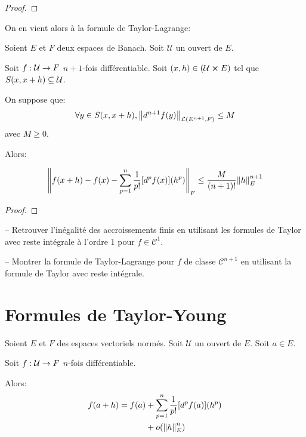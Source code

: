 \ifdefined\outputproof
\begin{proof}

\end{proof}
\fi

On en vient alors à la formule de Taylor-Lagrange:

\begin{theorem} 
	\label{theorem:taylor_lagrange_formula}
	Soient $E$ et $F$ deux espaces de Banach. Soit $\mathcal{U}$ un ouvert de
	$E$.

	Soit $f : \mathcal{U} \rightarrow F$ $n + 1$-fois différentiable.
	Soit $(x, h) \in (\mathcal{U} \cross E)$ tel que $S(x, x + h)
	\subseteq \mathcal{U}$.

	On suppose que:
	\begin{equation*}
		\forall y \in S(x, x + h), \norm{d^{n +
		1}f(y)}_{\mathcal{L}(E^{n + 1}, F)} \leq M
	\end{equation*}
	avec $M \geq 0$.

	Alors:

	\begin{equation*}
		\norm{f(x + h) - f(x) - \displaystyle \sum_{p = 1}^{n}
		\frac{1}{p!} [d^{p}f(x)](h^{p})}_{F} \leq \frac{M}{(n + 1)!}
		\norm{h}_{E}^{n + 1}
	\end{equation*}
\end{theorem}

\ifdefined\outputproof
\begin{proof}

\end{proof}
\fi

\begin{exercice}
	-- Retrouver l'inégalité des accroissements finis en utilisant les formules
	de Taylor avec reste intégrale à l'ordre $1$ pour $f \in \mathcal{C}^{1}$.

	-- Montrer la formule de Taylor-Lagrange pour $f$ de classe $\mathcal{C}^{n
	+ 1}$ en utilisant la formule de Taylor avec reste intégrale.
\end{exercice}

\section{Formules de Taylor-Young}

\begin{theorem}
	\label{theorem:taylor_young_formula}
	Soient $E$ et $F$ des espaces vectoriels normés. Soit $\mathcal{U}$ un
	ouvert de $E$. Soit $a \in E$.

	Soit $f : \mathcal{U} \rightarrow F$ $n$-fois différentiable.

	Alors:
	\begin{align*}
		f(a + h) = f(a) & + \displaystyle \sum_{p = 1}^{n} \frac{1}{p!}
		[d^{p}f(a)] (h^{p}) \\
						& + o(\norm{h}_{E}^{n})
	\end{align*}
\end{theorem}

